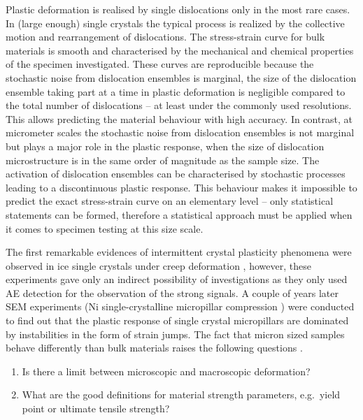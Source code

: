 Plastic deformation is realised by single dislocations only in the most rare cases. In (large enough) single crystals the typical process is realized by the collective motion and rearrangement of dislocations. The stress-strain curve for bulk materials is smooth and characterised by the mechanical and chemical properties of the specimen investigated. These curves are reproducible because the stochastic noise from dislocation ensembles is marginal, the size of the dislocation ensemble taking part at a time in plastic deformation is negligible compared to the total number of dislocations -- at least under the commonly used resolutions. This allows predicting the material behaviour with high accuracy. In contrast, at micrometer scales the stochastic noise from dislocation ensembles is not marginal but plays a major role in the plastic response, when the size of dislocation microstructure is in the same order of magnitude as the sample size. The activation of dislocation ensembles can be characterised by stochastic processes leading to a discontinuous plastic response. This behaviour makes it impossible to predict the exact stress-strain curve on an elementary level -- only statistical statements can be formed, therefore a statistical approach must be applied when it comes to specimen testing at this size scale.

The first remarkable evidences of intermittent crystal plasticity phenomena were observed in ice single crystals under creep deformation \cite{miguel2001intermittent,weiss2000statistical}, however, these experiments gave only an indirect possibility of investigations as they only used AE detection for the observation of the strong signals. A couple of years later SEM experiments (Ni single-crystalline micropillar compression \cite{Uchic986,Dimiduk1188,doi:10.1146/annurev-matsci-082908-145422}) were conducted to find out that the plastic response of single crystal micropillars are dominated by instabilities in the form of strain jumps. The fact that micron sized samples behave differently than bulk materials raises the following questions \cite{ARZT19985611,GREER2011654,ISPANOVITY20136234}.
\begin{enumerate}
\item Is there a limit between microscopic and macroscopic deformation?
\item What are the good definitions for material strength parameters, e.g.\ yield point or ultimate tensile strength?
\end{enumerate}

